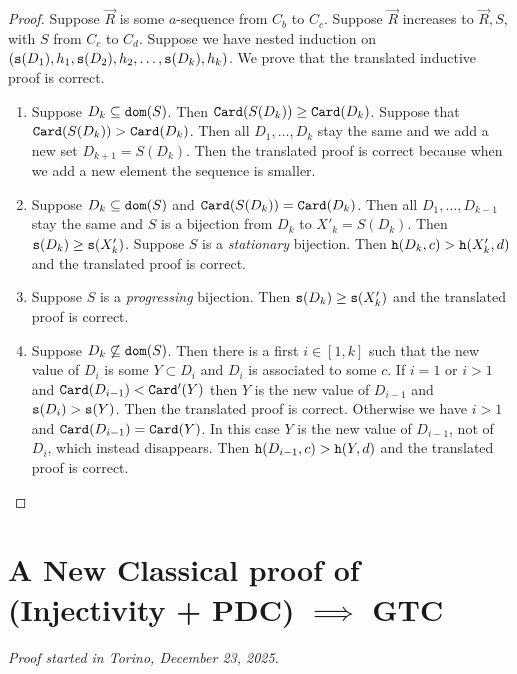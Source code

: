 \documentclass{lmcs}
\begin{document}
\begin{proof}
Suppose $\vec{R}$ is some $a$-sequence from $C_b$ to $C_c$. 
Suppose $\vec{R}$ increases to  $\vec{R},S$, with $S$ from $C_c$ to $C_d$.
Suppose we have nested induction on 
$({\tt s}(D_1),h_1,{\tt s}(D_2),h_2, \ldots, {\tt s}(D_k),h_k)$. We prove 
that the translated inductive proof is correct. 

\begin{enumerate}
\item
Suppose $D_k \subseteq {\tt dom}(S)$. Then ${\tt Card}(S(D_k)) \ge {\tt Card}(D_k)$.
Suppose  that ${\tt Card}(S(D_k)) > {\tt Card}(D_k)$.
Then all $D_1, \ldots, D_k$ stay the same and we add a new set $D_{k+1} = S(D_k)$. 
Then the translated proof is correct because when we add a new element the sequence
is smaller.

\item
Suppose $D_k \subseteq {\tt dom}(S)$ and ${\tt Card}(S(D_k)) = {\tt Card}(D_k)$.
Then all $D_1, \ldots, D_{k-1}$ stay the same and $S$ is a bijection 
from $D_k$ to $X'_k=S(D_k)$. Then ${\tt s}(D_k) \ge {\tt s}(X'_k)$.
Suppose $S$ is a \emph{stationary} bijection. Then ${\tt h}(D_k,c) > {\tt h}(X'_k,d)$
and the translated proof is correct.

\item
Suppose  $S$ is a \emph{progressing} bijection. Then ${\tt s}(D_k) \ge {\tt s}(X'_k)$ 
and the translated proof is correct.

\item
Suppose $D_k \not \subseteq {\tt dom}(S)$. Then there is a first $i \in [1,k]$ such that the new value 
of $D_i$ is some $Y \subset D_i$ and $D_i$ is associated to some $c$. 
If $i=1$ or $i>1$ and ${\tt Card}(D_{i-1}) <  {\tt Card}'(Y)$
then $Y$ is the new value of $D_{i-1}$ and ${\tt s}(D_i) > {\tt s}(Y)$. 
Then the translated proof is correct.
Otherwise we have $i>1$ and  ${\tt Card}(D_{i-1}) =  {\tt Card}(Y)$. In this case
$Y$ is the new value of $D_{i-1}$, not of $D_i$, which instead disappears.
Then ${\tt h}(D_{i-1},c) > {\tt h}(Y,d)$ and the translated proof is correct.
\end{enumerate}
\end{proof}

\newpage

\section{A New Classical proof of (Injectivity + PDC) $\implies$ GTC}
\label{section-classical-proof-PDC-implies-GTC}
\emph{Proof started in Torino, December 23, 2025}. 
\\
\end{document}
